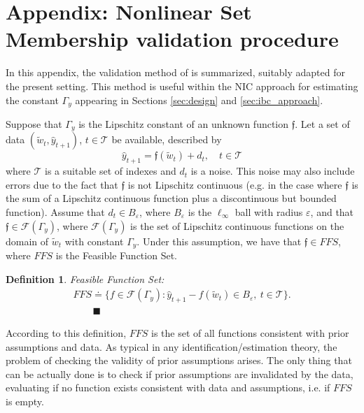 \documentclass[twocolumn,english,journal]{IEEEtran}
\newtheorem{definition}{Definition}
\begin{document}
\section{Appendix: Nonlinear Set Membership validation procedure}

\label{appendix1}

In this appendix, the validation method of \cite{MiNoAUT04} is summarized,
suitably adapted for the present setting. This method is useful within
the NIC approach for estimating the constant $\Gamma_{y}$ appearing
in Sections \ref{sec:design} and \ref{sec:ibc_approach}. 

Suppose that $\Gamma_{y}$ is the Lipschitz constant of an unknown
function $\mathfrak{f}$. Let a set of data $(\widetilde{w}_{t},\hat{y}_{t+1})$,
$t\in\mathcal{T}$ be available, described by
\[
\hat{y}_{t+1}=\mathfrak{f}\left(\widetilde{w}_{t}\right)+d_{t},\quad t\in\mathcal{T}
\]
where $\mathcal{T}$ is a suitable set of indexes and $d_{t}$ is
a noise. This noise may also include errors due to the fact that $\mathfrak{f}$
is not Lipschitz continuous (e.g. in the case where $\mathfrak{f}$
is the sum of a Lipschitz continuous function plus a discontinuous
but bounded function). Assume that $d_{t}\in B_{\varepsilon}$, where
$B_{\varepsilon}$ is the $\ell_{\infty}$ ball with radius $\varepsilon$,
and that $\mathfrak{f}\in\mathcal{F}\left(\Gamma_{y}\right)$, where
$\mathcal{F}\left(\Gamma_{y}\right)$ is the set of Lipschitz continuous
functions on the domain of $\widetilde{w}_{t}$ with constant $\Gamma_{y}$.
Under this assumption, we have that $\mathfrak{f}\in FFS$, where
$FFS$ is the Feasible Function Set.\medskip{}


\begin{definition} \emph{Feasible Function Set}:
\[
\begin{array}{r}
FFS\doteq\{f\in\mathcal{F}\left(\Gamma_{y}\right):\hat{y}_{t+1}-f\left(\widetilde{w}_{t}\right)\in B_{\varepsilon},\ t\in\mathcal{T}\}.\\
\qquad\blacksquare
\end{array}
\]
 \end{definition}\medskip{}


According to this definition, $FFS$ is the set of all functions consistent
with prior assumptions and data. As typical in any identification/estimation
theory, the problem of checking the validity of prior assumptions
arises. The only thing that can be actually done is to check if prior
assumptions are invalidated by the data, evaluating if no function
exists consistent with data and assumptions, i.e. if $FFS$ is empty.\medskip{}
\end{document}
